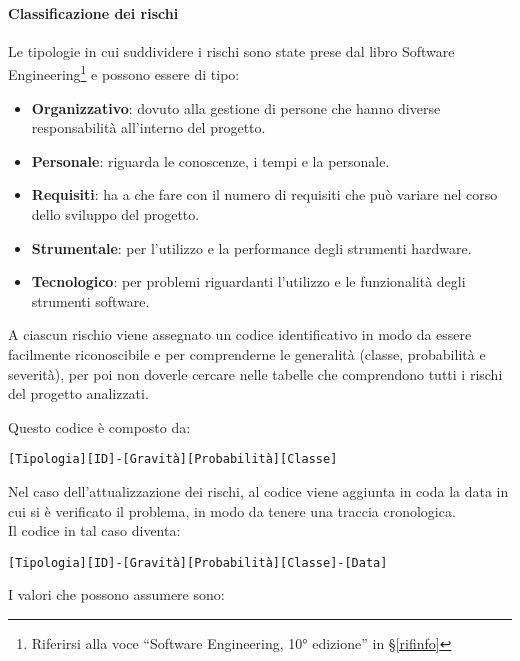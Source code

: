 			\paragraph{Classificazione dei rischi}
			Le tipologie in cui suddividere i rischi sono state prese dal libro Software
			Engineering\footnote{Riferirsi alla voce ``Software Engineering, 10° edizione'' in \S\ref{rifinfo}} e possono essere di tipo:
			\begin{itemize}
				\item \textbf{Organizzativo}: dovuto alla gestione di persone che hanno diverse responsabilità all'interno del progetto.
				\item \textbf{Personale}: riguarda le conoscenze, i tempi e la  personale.
				\item \textbf{Requisiti}: ha a che fare con il numero di requisiti che può variare nel corso dello sviluppo del progetto. %
				\item \textbf{Strumentale}: per l'utilizzo e la performance degli strumenti hardware.
				\item \textbf{Tecnologico}: per problemi riguardanti l'utilizzo e le funzionalità degli strumenti software.
			\end{itemize}

			A ciascun rischio viene assegnato un codice identificativo in modo da essere facilmente riconoscibile e per comprenderne le generalità
			(classe, probabilità e severità), per poi non doverle cercare nelle tabelle che comprendono tutti i rischi del progetto analizzati.

			Questo codice è composto da:

			\begin{center}
				\texttt{[Tipologia][ID]-[Gravità][Probabilità][Classe]}
			\end{center}
			
			Nel caso dell'attualizzazione dei rischi, al codice viene aggiunta in coda la data in cui si è verificato il problema, in modo da tenere una traccia cronologica.\\
			
			Il codice in tal caso diventa:
			
			\begin{center}
				\texttt{[Tipologia][ID]-[Gravità][Probabilità][Classe]-[Data]}
			\end{center}
			
			\clearpage
			I valori che possono assumere sono:

